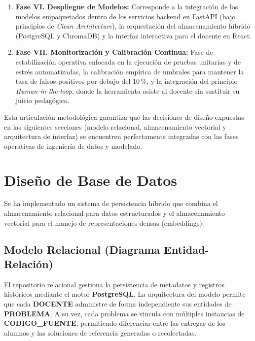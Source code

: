 \begin{enumerate}
    \item \textbf{Fase VI. Despliegue de Modelos:} Corresponde a la integración de los modelos empaquetados dentro de los servicios backend en FastAPI (bajo principios de \textit{Clean Architecture}), la orquestación del almacenamiento híbrido (PostgreSQL y ChromaDB) y la interfaz interactiva para el docente en React.
    
    \item \textbf{Fase VII. Monitorización y Calibración Continua:} Fase de estabilización operativa enfocada en la ejecución de pruebas unitarias y de estrés automatizadas, la calibración empírica de umbrales para mantener la tasa de falsos positivos por debajo del 10\,\%, y la integración del principio \textit{Human-in-the-loop}, donde la herramienta asiste al docente sin sustituir su juicio pedagógico.
\end{enumerate}

Esta articulación metodológica garantiza que las decisiones de diseño expuestas en las siguientes secciones (modelo relacional, almacenamiento vectorial y arquitectura de interfaz) se encuentren perfectamente integradas con las fases operativas de ingeniería de datos y modelado.

\section{Diseño de Base de Datos}

Se ha implementado un sistema de persistencia híbrido que combina el almacenamiento relacional para datos estructurados y el almacenamiento vectorial para el manejo de representaciones densas (embeddings).

\subsection{Modelo Relacional (Diagrama Entidad-Relación)}

El repositorio relacional gestiona la persistencia de metadatos y registros históricos mediante el motor \textbf{PostgreSQL}. La arquitectura del modelo permite que cada \textbf{DOCENTE} administre de forma independiente sus entidades de \textbf{PROBLEMA}. A su vez, cada problema se vincula con múltiples instancias de \textbf{CODIGO\_FUENTE}, permitiendo diferenciar entre las entregas de los alumnos y las soluciones de referencia generadas o recolectadas.

